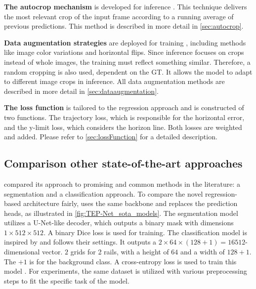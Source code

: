 \vspace{0.7cm} %

\noindent \textbf{The autocrop mechanism} is developed for inference \cite{tepNet2024}.
This technique delivers the most relevant crop of the input frame according to a running average of previous predictions.
This method is described in more detail in \autoref{sec:autocrop}.

\vspace{0.7cm} %

\noindent \textbf{Data augmentation strategies} are deployed for training \cite{tepNet2024}, including methods like image color variations and horizontal flips.
Since inference focuses on crops instead of whole images, the training must reflect something similar.
Therefore, a random cropping is also used, dependent on the \ac{GT}.
It allows the model to adapt to different image crops in inference.
All data augmentation methods are described in more detail in \autoref{sec:dataaugmentation}.

\vspace{0.7cm} %

\noindent \textbf{The loss function} is tailored to the regression approach and is constructed of two functions.
The trajectory loss, which is responsible for the horizontal error, and the y-limit loss, which considers the horizon line.
Both losses are weighted and added.
Please refer to \autoref{sec:lossFunction} for a detailed description.

\subsection{Comparison other state-of-the-art approaches}

\cite{tepNet2024} compared its approach to promising and common methods in the literature: a segmentation and a classification approach.
To compare the novel regression-based architecture fairly, \cite{tepNet2024} uses the same backbone and replaces the prediction heads, as illustrated in \autoref{fig:TEP-Net_sota_models}.
The segmentation model utilizes a U-Net-like \cite{uNet2015} decoder, which outputs a binary mask with dimensions $1 \times 512 \times 512$.
A binary Dice loss is used for training.
The classification model is inspired by \cite{li2022rail} and follows their settings.
It outputs a $2 \times 64 \times (128 + 1) = 16512$-dimensional vector.
$2$ grids for 2 rails, with a height of $64$ and a width of $128+1$.
The $+1$ is for the background class.
A cross-entropy loss is used to train this model \cite{tepNet2024}.
For experiments, the same dataset is utilized with various preprocessing steps to fit the specific task of the model.

